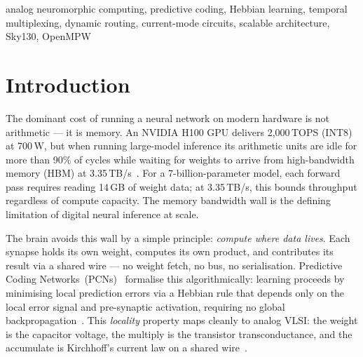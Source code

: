 \documentclass[journal,10pt,twoside]{IEEEtran}
\begin{document}
\begin{abstract}
\textbf{(3) A complete, open-source, simulation-verified proof-of-concept.}
The digital controller (1,117 standard cells; place-and-route closed at
$+8.46$\,ns setup margin with zero routing DRC violations on Sky130A)
and all analog blocks are SPICE-verified.
A hardware-calibrated Python/NumPy simulation demonstrates 484$\times$
single-step prediction error reduction and 483$\times$ specificity on a
synthetic template task, and identifies GHA with sequential deflation as
the correct training rule for this architecture.
All design files, RTL, and simulation scripts target the Efabless OpenMPW
shuttle for fabrication.
\end{abstract}

\begin{IEEEkeywords}
analog neuromorphic computing, predictive coding, Hebbian learning,
temporal multiplexing, dynamic routing, current-mode circuits,
scalable architecture, Sky130, OpenMPW
\end{IEEEkeywords}

\section{Introduction}
\label{sec:intro}

The dominant cost of running a neural network on modern hardware is not
arithmetic — it is memory.
An NVIDIA H100 GPU delivers 2{,}000\,TOPS (INT8) at 700\,W,
but when running large-model inference its arithmetic units are idle
for more than 90\% of cycles while waiting for weights to arrive from
high-bandwidth memory (HBM) at 3.35\,TB/s~\cite{nvidia2022h100}.
For a 7-billion-parameter model, each forward pass requires reading 14\,GB
of weight data; at 3.35\,TB/s, this bounds throughput regardless of
compute capacity.
The memory bandwidth wall is the defining limitation of digital neural
inference at scale.

The brain avoids this wall by a simple principle: \emph{compute where data
lives}.
Each synapse holds its own weight, computes its own product, and contributes
its result via a shared wire — no weight fetch, no bus, no serialisation.
Predictive Coding Networks~(PCNs)~\cite{rao1999predictive} formalise this
algorithmically: learning proceeds by minimising local prediction errors
via a Hebbian rule that depends only on the local error signal and
pre-synaptic activation, requiring no global
backpropagation~\cite{bogacz2017tutorial}.
This \emph{locality} property maps cleanly to analog VLSI:
the weight is the capacitor voltage, the multiply is the transistor
transconductance, and the accumulate is Kirchhoff's current law on a shared
wire~\cite{mead1989analog}.
\end{document}
